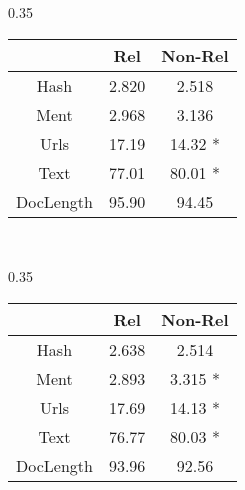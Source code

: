 \begin{table*}[]
\begin{smaller}
\hspace{1.8cm}
\begin{subtable}[]{0.35\textwidth}

\caption{Cutoff @ 50}\vspace{-0.45cm}
\begin{center}
\begin{tabular}{|c|c|c|}

\hline  & Rel & Non-Rel \\ 
\hline Hash & 2.820 &  	2.518  \\
\hline Ment & 2.968 &  	3.136  \\
\hline Urls & 17.19 &  	14.32 * \\
\hline Text & 77.01 &  	80.01 * \\
\hline
\hline DocLength & 95.90 &  	94.45  \\
\hline 
\end{tabular} 
\end{center}
\label{ratio50}
\end{subtable}
~
\begin{subtable}[]{0.35\textwidth}
\caption{Cutoff @ 100}\vspace{-0.45cm}
\begin{center}
\begin{tabular}{|c|c|c|}
\hline  & Rel & Non-Rel \\ 
\hline Hash & 2.638 &  	2.514  \\
\hline Ment & 2.893 &  	3.315 * \\
\hline Urls & 17.69 &  	14.13 * \\
\hline Text & 76.77 &  	80.03 * \\
\hline
\hline DocLength & 93.96 & 92.56  \\
\hline 
\end{tabular} 
\end{center}
\label{ratio100}
\end{subtable}


\end{smaller}
\vspace{0.70cm}
\end{table*}




